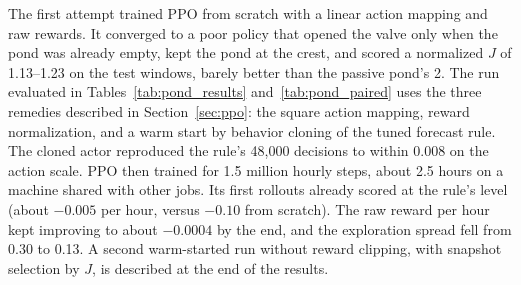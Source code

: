 The first attempt trained PPO from scratch with a linear action mapping and
raw rewards. It converged to a poor policy that opened the valve only when
the pond was already empty, kept the pond at the crest, and scored a
normalized $J$ of 1.13--1.23 on the test windows, barely better than the
passive pond's 2. The run evaluated in Tables~\ref{tab:pond_results} and~\ref{tab:pond_paired}
uses the three remedies described in
Section~\ref{sec:ppo}: the square action mapping, reward normalization, and
a warm start by behavior cloning of the tuned forecast rule. The cloned
actor reproduced the rule's 48{,}000 decisions to within 0.008 on the action
scale. PPO then trained for 1.5 million hourly steps, about 2.5 hours on a
machine shared with other jobs. Its first rollouts already scored at the
rule's level (about $-0.005$ per hour, versus $-0.10$ from scratch). The
raw reward per hour kept improving to about $-0.0004$ by the end, and the
exploration spread fell from 0.30 to 0.13. A second warm-started run without reward clipping, with snapshot selection by $J$, is
described at the end of the results.
